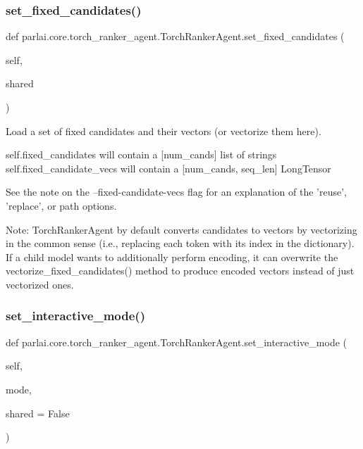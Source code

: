 \subsubsection{\texorpdfstring{set\+\_\+fixed\+\_\+candidates()}{set\_fixed\_candidates()}}
{\footnotesize\ttfamily def parlai.\+core.\+torch\+\_\+ranker\+\_\+agent.\+Torch\+Ranker\+Agent.\+set\+\_\+fixed\+\_\+candidates (\begin{DoxyParamCaption}\item[{}]{self,  }\item[{}]{shared }\end{DoxyParamCaption})}

\begin{DoxyVerb}Load a set of fixed candidates and their vectors (or vectorize them here).

self.fixed_candidates will contain a [num_cands] list of strings
self.fixed_candidate_vecs will contain a [num_cands, seq_len] LongTensor

See the note on the --fixed-candidate-vecs flag for an explanation of the
'reuse', 'replace', or path options.

Note: TorchRankerAgent by default converts candidates to vectors by vectorizing
in the common sense (i.e., replacing each token with its index in the
dictionary). If a child model wants to additionally perform encoding, it can
overwrite the vectorize_fixed_candidates() method to produce encoded vectors
instead of just vectorized ones.
\end{DoxyVerb}
 \mbox{\label{classparlai_1_1core_1_1torch__ranker__agent_1_1TorchRankerAgent_a9b90f2718c85b6373ead4cd207cfd3d8}} 
\subsubsection{\texorpdfstring{set\+\_\+interactive\+\_\+mode()}{set\_interactive\_mode()}}
{\footnotesize\ttfamily def parlai.\+core.\+torch\+\_\+ranker\+\_\+agent.\+Torch\+Ranker\+Agent.\+set\+\_\+interactive\+\_\+mode (\begin{DoxyParamCaption}\item[{}]{self,  }\item[{}]{mode,  }\item[{}]{shared = {\ttfamily False} }\end{DoxyParamCaption})}

